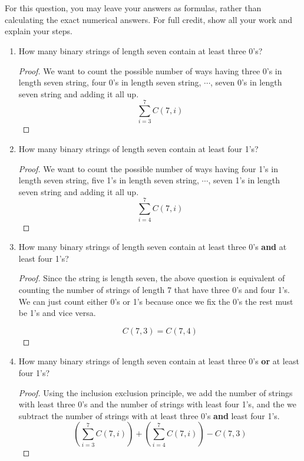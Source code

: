 \documentclass[11pt]{scrartcl}
\begin{document}
\section{}
For this question, you may leave your answers as formulas, rather than calculating the exact numerical answers.
For full credit, show all your work and explain your steps.
\begin{enumerate}[label=\alph*.]
	\item {
	      How many binary strings of length seven contain at least three 0’s?
	      \begin{proof}
		      We want to count the possible number of ways having three 0's in length seven string,
		      four 0's in length seven string, $\cdots$, seven 0's in length seven string and adding it all up.
		      $$
			      \sum_{i=3}^{7} C(7,i)
		      $$
	      \end{proof}
	      }
	\item{
	      How many binary strings of length seven contain at least four 1’s?
	      \begin{proof}
		      We want to count the possible number of ways having four 1's in length seven string,
		      five 1's in length seven string, $\cdots$, seven 1's in length seven string and adding it all up.
		      $$
			      \sum_{i=4}^{7} C(7,i)
		      $$
	      \end{proof}
	      }
	\item{
	      How many binary strings of length seven contain at least three 0’s \textbf{and} at least four 1’s?
	      \begin{proof}
		      Since the string is length seven, the above question is equivalent of counting the number of
		      strings of length 7 that have three 0's and four 1's. We can just count either 0's or 1's
		      because once we fix the 0's the rest must be 1's and vice versa.

		      $$
			      C(7,3) = C(7,4)
		      $$
	      \end{proof}
	      }
	\item{
	      How many binary strings of length seven contain at least three 0’s \textbf{or} at least four 1’s?
	      \begin{proof}
		      Using the inclusion exclusion principle, we add the number of strings with least three 0’s
		      and the number of strings with least four 1’s, and the we subtract the number of strings with
		      at least three 0's \textbf{and} least four 1’s.
		      $$
			      \left( \sum_{i=3}^{7} C(7,i) \right) + \left(  \sum_{i=4}^{7} C(7,i) \right) - C(7,3)
		      $$
	      \end{proof}
	      }
\end{enumerate}
\end{document}
